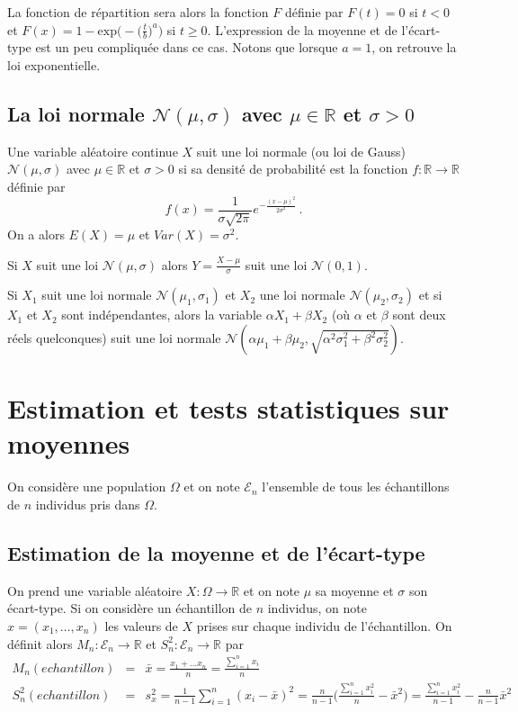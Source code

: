 \documentclass[12pt, a4paper]{article}
\begin{document}
La fonction de répartition sera alors la fonction $F$ définie par $F(t)=0$ si $t<0$ et 
$F(x)=1- \mathrm{exp}\big( - \big( \frac{t}{b} \big)^{a} \big)$ si $t\geq 0$. 
L'expression de la moyenne et de l'écart-type est un peu compliquée dans ce cas.
Notons que lorsque $a=1$, on retrouve la loi exponentielle.

\subsection[Loi normale]{La loi normale $\mathcal{N}(\mu,\sigma)$ avec $\mu\in \mathbb{R}$ et $\sigma>0$}

Une variable aléatoire continue $X$ suit une loi normale (ou loi de Gauss) $\mathcal{N}(\mu,\sigma)$ avec
$\mu\in \mathbb{R}$ et $\sigma>0$ si sa densité de probabilité est la 
fonction $f:\mathbb{R}\longrightarrow \mathbb{R}$ définie par  
$$
f(x)=\frac{1}{\sigma\sqrt{2\pi}} e^{-\frac{(x-\mu)^2}{2\sigma^2}}\,.
$$
On a alors  $E(X)=\mu$ et $Var(X)=\sigma^2$.

 Si $X$ suit une loi $\mathcal{N}(\mu,\sigma)$ alors $Y=\frac{X-\mu}{\sigma}$ suit
une loi $\mathcal{N}(0,1)$.

 Si $X_1$ suit une loi normale $\mathcal{N}(\mu_1,\sigma_1)$ et 
$X_2$ une loi normale $\mathcal{N}(\mu_2,\sigma_2)$ et si $X_1$ et $X_2$ sont indépendantes, alors
la variable $\alpha X_1 + \beta X_2$ (où $\alpha$ et $\beta$ sont deux réels quelconques) suit une loi
normale $\mathcal{N}(\alpha\mu_1+\beta\mu_2,\sqrt{\alpha^2\sigma_1^2+\beta^2\sigma_2^2})$.


\section{Estimation et tests statistiques sur moyennes }
On considère une population $\Omega$ et on note $\mathcal{E}_n$ l'ensemble de tous les échantillons de $n$
individus pris dans $\Omega$.

\subsection{Estimation de la moyenne et de l'écart-type} \label{EstimationMoyenne}
On prend une variable aléatoire $X : \Omega \longrightarrow \mathbb{R}$ et on note $\mu$ sa moyenne et
$\sigma$ son écart-type. 
Si on considère un échantillon de $n$ individus, on note $x=(x_1,\hdots,x_n)$ les valeurs de $X$ prises sur chaque individu de l'échantillon.
On définit alors $M_n : \mathcal{E}_n \longrightarrow \mathbb{R}$ 
et $S_n^2 : \mathcal{E}_n \longrightarrow \mathbb{R}$
par 
\begin{eqnarray*}
M_n(echantillon) & = & \bar{x}=\frac{x_1+\hdots x_n}{n} = \frac{\sum_{i=1}^n x_i}{n}\\
S_n^2(echantillon) & = & s_x^2=\frac{1}{n-1}\sum_{i=1}^n (x_i-\bar{x})^2 = \frac{n}{n-1}\big( \frac{\sum_{i=1}^n x_i^2}{n} - \bar{x}^2 \big)
=\frac{\sum_{i=1}^n x_i^2}{n-1} -  \frac{n}{n-1}\bar{x}^2
\end{eqnarray*}
\end{document}
